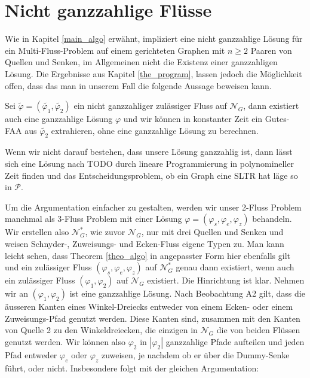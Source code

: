 \chapter{Nicht ganzzahlige Flüsse}

Wie in Kapitel \ref{main_algo} erwähnt, impliziert eine nicht ganzzahlige Lösung für ein Multi-Fluss-Problem auf einem gerichteten Graphen mit $n\geq 2$ Paaren von Quellen und Senken, im Allgemeinen nicht die Existenz einer ganzzahligen Lösung. Die Ergebnisse aus Kapitel \ref{the_program}, lassen jedoch die Möglichkeit offen, dass das man in unserem Fall die folgende Aussage beweisen kann.

\begin{conjecture}\label{int_conj}
Sei $\tilde{\varphi}=(\tilde{\varphi_1},\tilde{\varphi_2})$ ein nicht ganzzahliger zulässiger Fluss auf $\mathcal{N}_G$, dann existiert auch eine ganzzahlige Lösung $\varphi$ und wir können in konstanter Zeit ein Gutes-FAA aus $\tilde{\varphi_2}$ extrahieren, ohne eine ganzzahlige Lösung zu berechnen.
\end{conjecture}

\begin{remark}
Wenn wir nicht darauf bestehen, dass unsere Lösung ganzzahlig ist, dann lässt sich eine Lösung nach TODO durch lineare Programmierung in polynomineller Zeit finden und das Entscheidungsproblem, ob ein Graph eine SLTR hat läge so in $\mathcal{P}$.
\end{remark}

Um die Argumentation einfacher zu gestalten, werden wir unser 2-Fluss Problem manchmal als 3-Fluss Problem mit einer Lösung $\varphi=(\varphi_s,\varphi_e,\varphi_z)$ behandeln. Wir erstellen also $\mathcal{N}_G^*$, wie zuvor $\mathcal{N}_G$, nur mit drei Quellen und Senken und weisen Schnyder-, Zuweisungs- und Ecken-Fluss eigene Typen zu. Man kann leicht sehen, dass Theorem \ref{theo_algo} in angepasster Form hier ebenfalls gilt und ein zulässiger  Fluss $(\varphi_s,\varphi_e,\varphi_z)$ auf $\mathcal{N}_G^*$ genau dann existiert, wenn auch ein zulässiger Fluss $(\varphi_1,\varphi_2)$ auf $\mathcal{N}_G$ existiert. Die Hinrichtung ist klar. Nehmen wir an $(\varphi_1,\varphi_2)$ ist eine ganzzahlige Lösung. Nach Beobachtung A2 gilt, dass die äusseren Kanten eines Winkel-Dreiecks entweder von einem Ecken- oder einem Zuweisungs-Pfad genutzt werden. Diese Kanten sind, zusammen mit den Kanten von Quelle 2 zu den Winkeldreiecken, die einzigen in $\mathcal{N}_G$ die von beiden Flüssen genutzt werden. Wir können also $\varphi_2$ in $|\varphi_2|$ ganzzahlige Pfade aufteilen und jeden Pfad entweder $\varphi_e$ oder $\varphi_z$ zuweisen, je nachdem ob er über die Dummy-Senke führt, oder nicht. Insbesondere folgt mit der gleichen Argumentation:  

